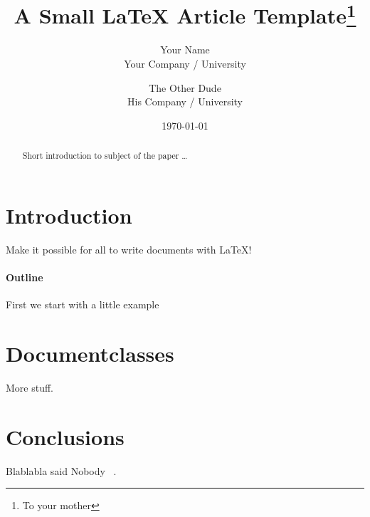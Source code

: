 \documentclass{article}
\title{A Small \LaTeX{} Article Template\thanks{To your mother}}
\author{Your Name  \\
	Your Company / University  \\
	\and 
	The Other Dude \\
	His Company / University \\
	}
\date{\today}
\begin{document}
\maketitle

\begin{abstract}
Short introduction to subject of the paper \ldots 
\end{abstract}

\section{Introduction}
Make it possible for all to write documents with \LaTeX{}!

\paragraph{Outline}
First we start with a little example

\section{Documentclasses} \label{documentclasses}
More stuff.

\section{Conclusions}\label{conclusions}
Blablabla said Nobody ~\cite{PAKEMAN2019127}.

{}

\end{document}
